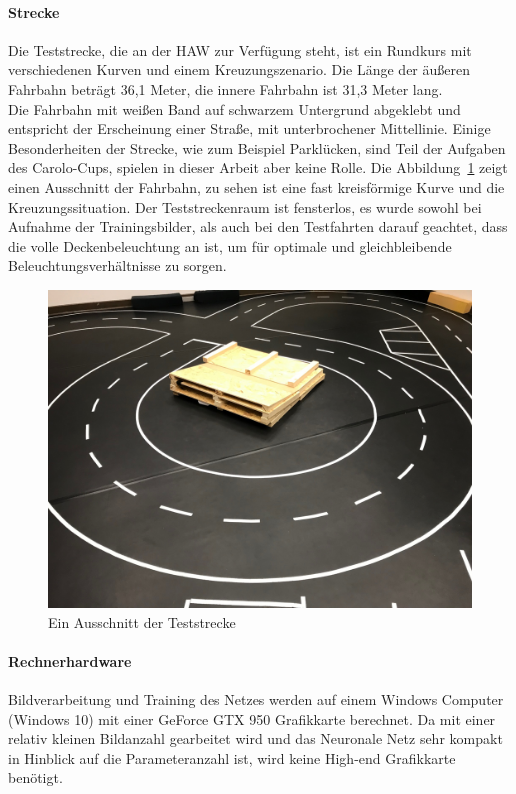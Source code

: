 \paragraph{Strecke}
Die Teststrecke, die an der HAW zur Verfügung steht, ist ein Rundkurs mit verschiedenen Kurven und einem Kreuzungszenario. Die Länge der äußeren Fahrbahn beträgt 36,1 Meter, die innere Fahrbahn ist 31,3 Meter lang.\\
Die Fahrbahn mit weißen Band auf schwarzem Untergrund abgeklebt und entspricht der Erscheinung einer Straße, mit unterbrochener Mittellinie. Einige Besonderheiten der Strecke, wie zum Beispiel Parklücken, sind Teil der Aufgaben des Carolo-Cups, spielen in dieser Arbeit aber keine Rolle.
Die Abbildung~\ref{img:teststrecke} zeigt einen Ausschnitt der Fahrbahn, zu sehen ist eine fast kreisförmige Kurve und die Kreuzungssituation. 
Der Teststreckenraum ist fensterlos, es wurde sowohl bei Aufnahme der Trainingsbilder, als auch bei den Testfahrten darauf geachtet, dass die volle Deckenbeleuchtung an ist, um für optimale und gleichbleibende Beleuchtungsverhältnisse zu sorgen.

\begin{figure}[h]
	\centering
	\includegraphics[scale=0.15]{figures/Teststrecke-Ausschnitt.jpg}
	\caption{Ein Ausschnitt der Teststrecke}
	\label{img:teststrecke}
\end{figure}
\paragraph{Rechnerhardware}
Bildverarbeitung und Training des Netzes werden auf einem Windows Computer (Windows 10) mit einer GeForce GTX 950 Grafikkarte berechnet. Da mit einer relativ kleinen Bildanzahl gearbeitet wird und das Neuronale Netz sehr kompakt in Hinblick auf die Parameteranzahl ist, wird keine High-end Grafikkarte benötigt.


